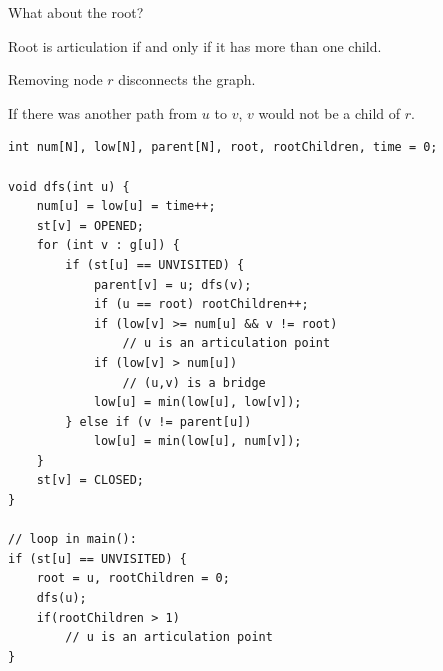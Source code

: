 \documentclass[10pt]{beamer}
\begin{document}
\begin{frame}

What about the root? \pause 

\vspace{0.5cm}

Root is articulation if and only if it has more than one child.

\vspace{0.5cm}

\begin{center}
\end{center}

\vspace{0.5cm}

Removing node $r$ disconnects the graph.

\vspace{0.5cm}

If there was another path from $u$ to $v$, $v$ would not be a child of $r$.

\end{frame}


\begin{frame}[fragile]

\begin{lstlisting}
int num[N], low[N], parent[N], root, rootChildren, time = 0;

void dfs(int u) {
    num[u] = low[u] = time++;
    st[v] = OPENED;
    for (int v : g[u]) {
        if (st[u] == UNVISITED) {
            parent[v] = u; dfs(v);
            if (u == root) rootChildren++;
            if (low[v] >= num[u] && v != root)
                // u is an articulation point
            if (low[v] > num[u])
                // (u,v) is a bridge
            low[u] = min(low[u], low[v]);
        } else if (v != parent[u])
            low[u] = min(low[u], num[v]);
    }
    st[v] = CLOSED;
}

// loop in main():
if (st[u] == UNVISITED) {
    root = u, rootChildren = 0;
    dfs(u);
    if(rootChildren > 1)
        // u is an articulation point
}
\end{lstlisting}

\end{frame}
\end{document}
